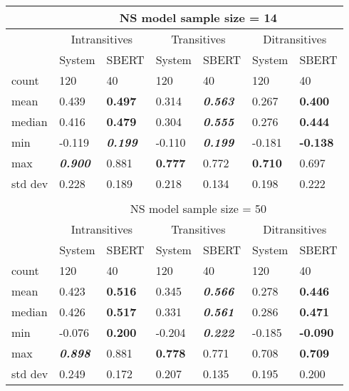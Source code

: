 \begin{table}[htb!]
\begin{center}
\begin{tabular}{|l||l|l||l|l||l|l|}
\hline
 & \multicolumn{6}{c|}{NS model sample size = 14} \\
\hline
 & \multicolumn{2}{c||}{Intransitives} & \multicolumn{2}{c||}{Transitives} & \multicolumn{2}{c|}{Ditransitives} \\
\hline
		& System 	& SBERT 		& System 	& SBERT 		& System 	& SBERT 		\\
\hline
\hline
count 	& 120 		& 40 		& 120 		& 40 		& 120 		& 40		 \\
\hline
mean 	& 0.439 	& \textbf{0.497} 	& 0.314 	& \textit{\textbf{0.563}}		& 0.267 	& \textbf{0.400}	 \\
\hline
median 	& 0.416 	& \textbf{0.479} 	& 0.304 	& \textit{\textbf{0.555}}		& 0.276 	& \textbf{0.444}	 \\
\hline
min 	& -0.119 	& \textit{\textbf{0.199}} 	& -0.110 	& \textit{\textbf{0.199}}	& -0.181 	& \textbf{-0.138} \\
\hline
max 	& \textit{\textbf{0.900}} 	& 0.881		& \textbf{0.777} 	& 0.772		& \textbf{0.710} 	& 0.697	 \\
\hline
std dev & 0.228 	& 0.189		& 0.218 	& 0.134		& 0.198 	& 0.222	 \\
\hline
\multicolumn{7}{c}{} \\
\hline
 & \multicolumn{6}{c|}{NS model sample size = 50} \\
\hline
 & \multicolumn{2}{c||}{Intransitives} & \multicolumn{2}{c||}{Transitives} & \multicolumn{2}{c|}{Ditransitives} \\
\hline
		& System 	& SBERT 				& System 	& SBERT 						& System 	& SBERT \\
\hline
\hline
count 	& 120 		& 40 				& 120 		& 40 						& 120 		& 40 	\\
\hline
mean 	& 0.423 	& \textbf{0.516} 	& 0.345 	& \textit{\textbf{0.566}}	& 0.278 	& \textbf{0.446} \\
\hline
median 	& 0.426 	& \textbf{0.517}	& 0.331 	& \textit{\textbf{0.561}}	& 0.286 	& \textbf{0.471} \\
\hline
min 	& -0.076 	& \textbf{0.200}	& -0.204 	& \textit{\textbf{0.222}}	 & -0.185 	& \textbf{-0.090} \\
\hline
max & \textit{\textbf{0.898}} & 0.881	& \textbf{0.778} & 0.771	 			& 0.708 	& \textbf{0.709} \\
\hline
std dev & 0.249 	& 0.172 			& 0.207 	& 0.135 					& 0.195 	& 0.200 \\

\end{tabular}
\end{center}
\end{table}
